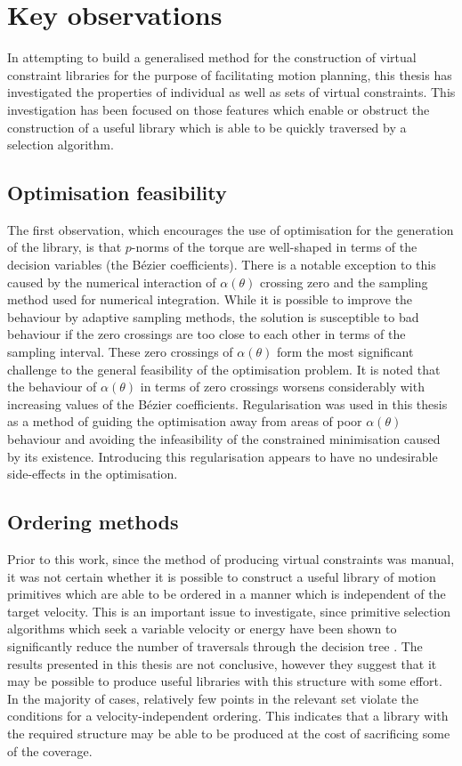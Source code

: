 \section{Key observations}
In attempting to build a generalised method for the construction of virtual constraint libraries for the purpose of facilitating motion planning, this thesis has investigated the properties of individual as well as sets of virtual constraints. This investigation has been focused on those features which enable or obstruct the construction of a useful library which is able to be quickly traversed by a selection algorithm.

\subsection{Optimisation feasibility}
The first observation, which encourages the use of optimisation for the generation of the library, is that $p$-norms of the torque are well-shaped in terms of the decision variables (the Bézier coefficients). There is a notable exception to this caused by the numerical interaction of $\alpha(\theta)$ crossing zero and the sampling method used for numerical integration. While it is possible to improve the behaviour by adaptive sampling methods, the solution is susceptible to bad behaviour if the zero crossings are too close to each other in terms of the sampling interval. These zero crossings of $\alpha(\theta)$ form the most significant challenge to the general feasibility of the optimisation problem. It is noted that the behaviour of $\alpha(\theta)$ in terms of zero crossings worsens considerably with increasing values of the Bézier coefficients. Regularisation was used in this thesis as a method of guiding the optimisation away from areas of poor $\alpha(\theta)$ behaviour and avoiding the infeasibility of the constrained minimisation caused by its existence. Introducing this regularisation appears to have no undesirable side-effects in the optimisation.

\subsection{Ordering methods}
Prior to this work, since the method of producing virtual constraints was manual, it was not certain whether it is possible to construct a useful library of motion primitives which are able to be ordered in a manner which is independent of the target velocity. This is an important issue to investigate, since primitive selection algorithms which seek a variable velocity or energy have been shown to significantly reduce the number of traversals through the decision tree \cite{manchester13planning}. The results presented in this thesis are not conclusive, however they suggest that it may be possible to produce useful libraries with this structure with some effort. In the majority of cases, relatively few points in the relevant set violate the conditions for a velocity-independent ordering. This indicates that a library with the required structure may be able to be produced at the cost of sacrificing some of the coverage.

